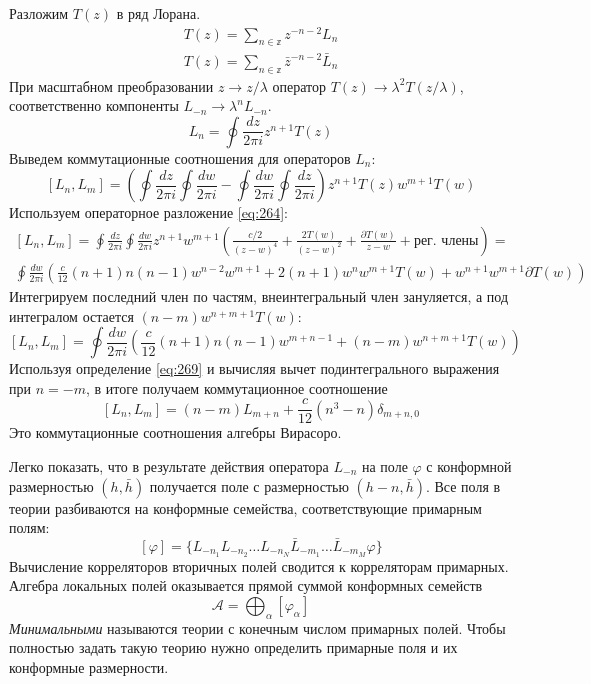 \documentclass[a4paper,12pt]{article} \usepackage[utf8x]{inputenc} \usepackage[russian]{babel}
\theoremstyle{definition} \newtheorem{corollary}{Corollary}[theorem] \theoremstyle{definition}
\begin{document}
Разложим $T(z)$ в ряд Лорана.
\begin{eqnarray}
  \label{eq:268} T(z)=\sum_{n\in \mathbb{z}}z^{-n-2}L_{n}\\ T(z)=\sum_{n\in \mathbb{z}}\bar
z^{-n-2}\bar L_{n}
\end{eqnarray} При масштабном преобразовании $z\to z/\lambda$ оператор $T(z)\to
\lambda^{2}T(z/\lambda)$, соответственно компоненты $L_{-n}\to \lambda^{n}L_{-n}$.
\begin{equation}
  \label{eq:269} L_{n}=\oint \frac{dz}{2\pi i} z^{n+1} T(z)
\end{equation} Выведем коммутационные соотношения для операторов $L_{n}$:
\begin{equation}
  \label{eq:270} [L_{n},L_{m}]=\left( \oint \frac{dz}{2\pi i}\oint \frac{dw}{2\pi i}-\oint
\frac{dw}{2\pi i}\oint \frac{dz}{2\pi i}\right) z^{n+1} T(z)w^{m+1}T(w)
\end{equation} Используем операторное разложение \eqref{eq:264}:
\begin{multline}
  \label{eq:271} [L_{n},L_{m}]=\oint \frac{dz}{2\pi i} \oint \frac{dw}{2\pi i} z^{n+1} w^{m+1}\left(
\frac{c/2}{(z-w)^{4}} +\frac{2T(w)}{(z-w)^{2}}+\frac{\partial T(w) }{z-w} +\mbox{рег. члены}\right)
=\\ \oint \frac{dw}{2\pi i} \left(\frac{c}{12} (n+1)n(n-1)w^{n-2}w^{m+1} +
2(n+1)w^{n}w^{m+1}T(w)+w^{n+1}w^{m+1}\partial T(w)\right)
\end{multline} Интегрируем последний член по частям, внеинтегральный член зануляется, а под
интегралом остается $(n-m)w^{n+m+1}T(w)$:
\begin{equation}
  \label{eq:272} [L_{n},L_{m}]=\oint \frac{dw}{2\pi i} \left(\frac{c}{12} (n+1)n(n-1)w^{m+n-1}+
(n-m)w^{n+m+1}T(w)\right)
\end{equation} Используя определение \eqref{eq:269} и вычисляя вычет подинтегрального выражения при
$n=-m$, в итоге получаем коммутационное соотношение
\begin{equation}
  \label{eq:273} [L_{n},L_{m}]=(n-m)L_{m+n}+\frac{c}{12}(n^{3}-n)\delta_{m+n,0}
\end{equation} Это коммутационные соотношения алгебры Вирасоро.

Легко показать, что в результате действия оператора $L_{-n}$ на поле $\varphi$ с конформной
размерностью $(h,\bar h)$ получается поле с размерностью $(h-n,\bar h)$. Все поля в теории
разбиваются на конформные семейства, соответствующие примарным полям:
\begin{equation}
  \label{eq:274} [\varphi]=\{L_{-n_{1}}L_{-n_{2}}\dots L_{-n_{N}}\bar L_{-m_{1}}\dots \bar
L_{-m_{M}}\varphi\}
\end{equation} Вычисление корреляторов вторичных полей сводится к корреляторам примарных. Алгебра
локальных полей оказывается прямой суммой конформных семейств
\begin{equation}
  \label{eq:275} \mathcal{A} =\bigoplus_{\alpha}[\varphi_{\alpha}]
\end{equation} {\it Минимальными} называются теории с конечным числом примарных полей. Чтобы
полностью задать такую теорию нужно определить примарные поля и их конформные размерности.
\end{document}
